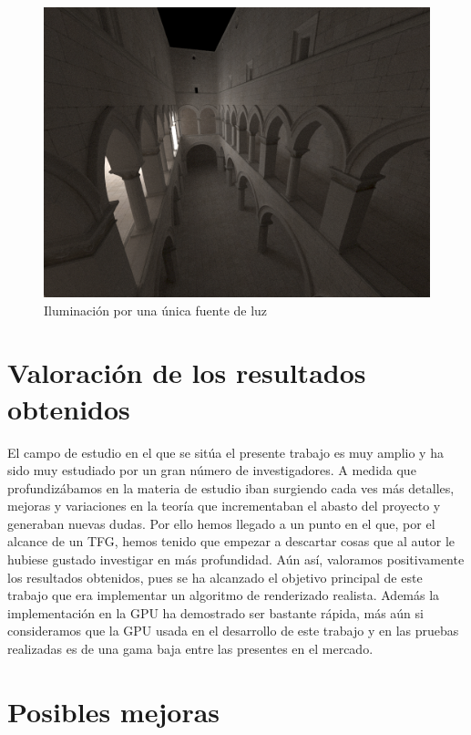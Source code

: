 \begin{figure}
\centering
\includegraphics[width=5in]{single_light_sponza.png}
\caption{Iluminación por una única fuente de luz}
\end{figure}

\clearpage

\section{Valoración de los resultados obtenidos}


El campo de estudio en el que se sitúa el presente trabajo es muy amplio y ha sido muy estudiado por un gran número de investigadores. A medida que profundizábamos en la materia de estudio iban surgiendo cada ves más detalles, mejoras y variaciones en la teoría que incrementaban el abasto del proyecto y generaban nuevas dudas. Por ello hemos llegado a un punto en el que, por el alcance de un TFG, hemos tenido que empezar a descartar cosas que al autor le hubiese gustado investigar en más profundidad. Aún así, valoramos positivamente los resultados obtenidos, pues se ha alcanzado el objetivo principal de este trabajo que era implementar un algoritmo de renderizado realista. Además la implementación en la GPU ha demostrado ser bastante rápida, más aún si consideramos que la GPU usada en el desarrollo de este trabajo y en las pruebas realizadas es de una gama baja entre las presentes en el mercado.

\clearpage

\section{Posibles mejoras}

